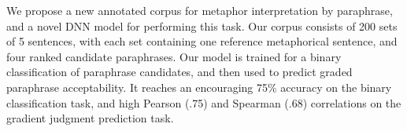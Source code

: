 We propose a new annotated corpus for metaphor interpretation by paraphrase, and a novel DNN model for performing this task. Our corpus consists of 200 sets of 5 sentences, with each set containing one reference metaphorical sentence, and four ranked candidate paraphrases. Our model is trained for a binary classification of paraphrase candidates, and then used to predict graded paraphrase acceptability. It reaches an encouraging 75\% accuracy on the binary classification task, and high Pearson (.75) and Spearman (.68) correlations on the gradient judgment prediction task.
